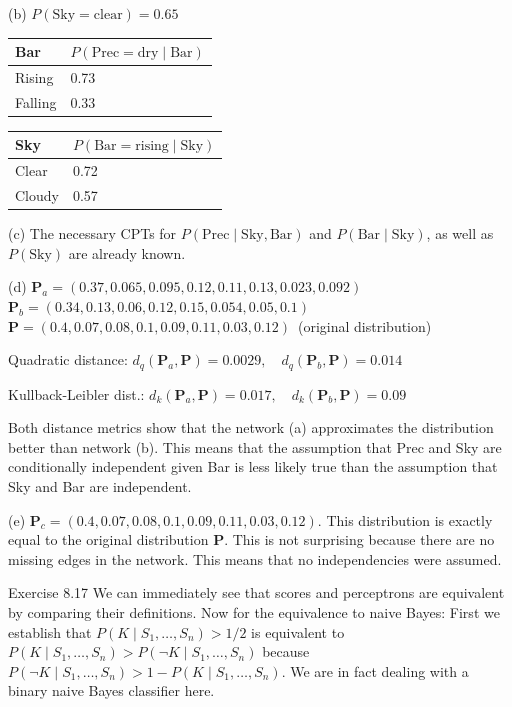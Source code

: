 \documentclass[10pt]{book}
\begin{document}
(b) $P(\text{Sky}=\text{clear})=0.65$

\begin{tabular}{ll}
\hline
Bar & $P(\text{Prec}=\text{dry}\mid \text{Bar})$ \\
\hline
Rising & 0.73 \\
Falling & 0.33 \\
\hline
\end{tabular}

\begin{tabular}{ll}
\hline
Sky & $P(\text{Bar}=\text{rising}\mid \text{Sky})$ \\
\hline
Clear & 0.72 \\
Cloudy & 0.57 \\
\hline
\end{tabular}

(c) The necessary CPTs for $P(\text{Prec}\mid \text{Sky}, \text{Bar})$ and $P(\text{Bar}\mid \text{Sky})$, as well as $P(\text{Sky})$ are already known.

(d) $\boldsymbol{P}_{a}=(0.37,0.065,0.095,0.12,0.11,0.13,0.023,0.092)$
$\boldsymbol{P}_{b}=(0.34,0.13,0.06,0.12,0.15,0.054,0.05,0.1)$
$\boldsymbol{P}=(0.4,0.07,0.08,0.1,0.09,0.11,0.03,0.12)\,$ (original distribution)

Quadratic distance: $d_{q}\!\left(\boldsymbol{P}_{a}, \boldsymbol{P}\right)=0.0029,\quad d_{q}\!\left(\boldsymbol{P}_{b}, \boldsymbol{P}\right)=0.014$

Kullback-Leibler dist.: $d_{k}\!\left(\boldsymbol{P}_{a}, \boldsymbol{P}\right)=0.017,\quad d_{k}\!\left(\boldsymbol{P}_{b}, \boldsymbol{P}\right)=0.09$

Both distance metrics show that the network (a) approximates the distribution better than network (b). This means that the assumption that Prec and Sky are conditionally independent given Bar is less likely true than the assumption that Sky and Bar are independent.

(e) $\boldsymbol{P}_{c}=(0.4,0.07,0.08,0.1,0.09,0.11,0.03,0.12)$. This distribution is exactly equal to the original distribution $\boldsymbol{P}$. This is not surprising because there are no missing edges in the network. This means that no independencies were assumed.

Exercise 8.17 We can immediately see that scores and perceptrons are equivalent by comparing their definitions. Now for the equivalence to naive Bayes: First we establish that $P\!\left(K \mid S_{1}, \ldots, S_{n}\right)>1/2$ is equivalent to $P\!\left(K \mid S_{1}, \ldots, S_{n}\right)>P\!\left(\neg K \mid S_{1}, \ldots, S_{n}\right)$ because $P\!\left(\neg K \mid S_{1}, \ldots, S_{n}\right)>1-P\!\left(K \mid S_{1}, \ldots, S_{n}\right)$. We are in fact dealing with a binary naive Bayes classifier here.
\end{document}
